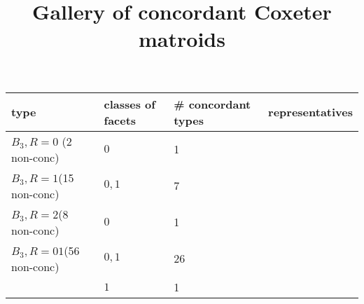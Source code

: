 \documentclass[11pt]{amsart}
\begin{document}
\title{Gallery of concordant Coxeter matroids}
  \begin{center}
    \begin{longtable}{p{2cm}p{1cm}p{1cm}p{10cm}}
        type & classes of facets & \# concordant types & representatives\\\hline
        $B_3, R=0$ \newline\small(2 non-conc) & $0$ & 1 &
        
        \\\hline\hline
        $B_3, R=1$\newline\small(15 non-conc) & $0,1$ & 7 &
        \mbox{}
        \mbox{}
        \mbox{}
        \mbox{}
        \mbox{}
        \mbox{}
        \mbox{}        
        \\\hline\hline
        $B_3, R=2$\newline\small(8 non-conc) & $0$ & 1 &
        
        \\\hline\hline
        $B_3,R=01$\newline\small(56 non-conc) & $0,1$ & 26 &
        \mbox{}
        \mbox{}
        \mbox{}
        \mbox{}
        \mbox{}
        \mbox{}
        \mbox{}
        \mbox{}
        \mbox{}
        \mbox{}
        \mbox{}
        \mbox{}
        \mbox{}
        \mbox{}
        \mbox{}
        \mbox{}
        \mbox{}
        \mbox{}
        \mbox{}
        \mbox{}
        \mbox{}
        \mbox{}
        \mbox{}
        \mbox{}
        \mbox{}
        \mbox{}
      \\\hline
        & $1$ & 1 &
        
        \\\hline\hline

\end{longtable}
\end{center}
\end{document}
